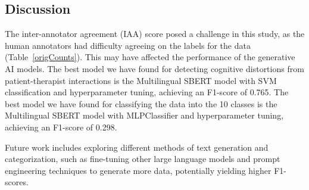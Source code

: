 \documentclass[a0,landscape]{a0poster}
\begin{document}
\begin{multicols}{4}
\color{Teal}
\section*{Discussion}
\color{Black}
The inter-annotator agreement (IAA) score posed a challenge in this study, as the human annotators had difficulty agreeing on the labels for the data (Table~\ref*{origCounts}). 
This may have affected the performance of the generative AI models. 
The best model we have found for detecting cognitive distortions from patient-therapist interactions is the Multilingual SBERT model with SVM classification and hyperparameter tuning, 
achieving an F1-score of 0.765. 
The best model we have found for classifying the data into the 10 classes is the Multilingual SBERT model with MLPClassifier and hyperparameter tuning, achieving an F1-score of 0.298.
\vspace{0.5cm}

Future work includes exploring different methods of text 
generation and categorization, such as fine-tuning other large language models and prompt engineering techniques to generate more data, potentially yielding higher F1-scores.


\end{multicols}
\end{document}
